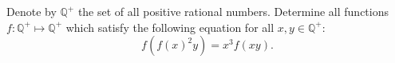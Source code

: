 Denote by $\mathbb{Q}^+$ the set of all positive rational numbers. Determine all functions $f : \mathbb{Q}^+ \mapsto \mathbb{Q}^+$ which satisfy the following equation for all $x, y \in \mathbb{Q}^+:$ \[f\left( f(x)^2y \right) = x^3 f(xy).\]